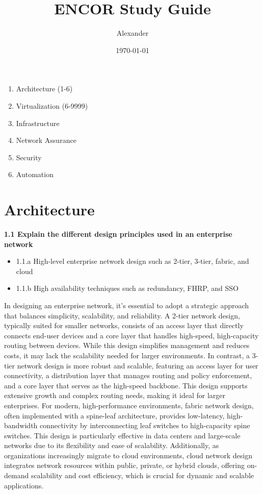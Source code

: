 \documentclass{article}
\title{ENCOR Study Guide}
\author{Alexander}
\date{\today}
\begin{document}
\maketitle

\begin{enumerate}
\item Architecture (1-6)
\item Virtualization (6-9999)
\item Infrastructure
\item Network Assurance
\item Security
\item Automation
\end{enumerate}

\section{Architecture}
\textbf{1.1 Explain the different design principles used in an enterprise network}
\begin{itemize}
\item 1.1.a High-level enterprise network design such as 2-tier, 3-tier, fabric, and cloud
\item 1.1.b High availability techniques such as redundancy, FHRP, and SSO
\end{itemize}

	In designing an enterprise network, it's essential to adopt a strategic approach that balances simplicity, scalability, and reliability. A 2-tier network design, typically suited for smaller networks, consists of an access layer that directly connects end-user devices and a core layer that handles high-speed, high-capacity routing between devices. While this design simplifies management and reduces costs, it may lack the scalability needed for larger environments. In contrast, a 3-tier network design is more robust and scalable, featuring an access layer for user connectivity, a distribution layer that manages routing and policy enforcement, and a core layer that serves as the high-speed backbone. This design supports extensive growth and complex routing needs, making it ideal for larger enterprises. For modern, high-performance environments, fabric network design, often implemented with a spine-leaf architecture, provides low-latency, high-bandwidth connectivity by interconnecting leaf switches to high-capacity spine switches. This design is particularly effective in data centers and large-scale networks due to its flexibility and ease of scalability. Additionally, as organizations increasingly migrate to cloud environments, cloud network design integrates network resources within public, private, or hybrid clouds, offering on-demand scalability and cost efficiency, which is crucial for dynamic and scalable applications.\\
\end{document}

